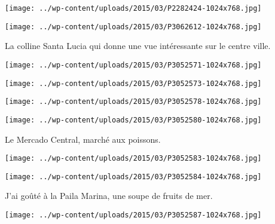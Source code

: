  

\begin{center} \texttt{[image: ../wp-content/uploads/2015/03/P2282424-1024x768.jpg]} \end{center}

 

\begin{center} \texttt{[image: ../wp-content/uploads/2015/03/P3062612-1024x768.jpg]} \end{center}

La colline Santa Lucia qui donne une vue intéressante sur le centre ville. 

\begin{center} \texttt{[image: ../wp-content/uploads/2015/03/P3052571-1024x768.jpg]} \end{center}

 

\begin{center} \texttt{[image: ../wp-content/uploads/2015/03/P3052573-1024x768.jpg]} \end{center}

 

\begin{center} \texttt{[image: ../wp-content/uploads/2015/03/P3052578-1024x768.jpg]} \end{center}

 

\begin{center} \texttt{[image: ../wp-content/uploads/2015/03/P3052580-1024x768.jpg]} \end{center}

Le Mercado Central, marché aux poissons. 

\begin{center} \texttt{[image: ../wp-content/uploads/2015/03/P3052583-1024x768.jpg]} \end{center}

 

\begin{center} \texttt{[image: ../wp-content/uploads/2015/03/P3052584-1024x768.jpg]} \end{center}

J'ai goûté à la Paila Marina, une soupe de fruits de mer. 

\begin{center} \texttt{[image: ../wp-content/uploads/2015/03/P3052587-1024x768.jpg]} \end{center}

